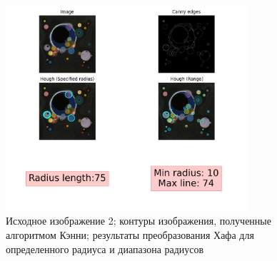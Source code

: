 \begin{figure}[ht!]
    \centering
    \includegraphics[width=0.8\textwidth]{images/circles/Kandinsky_Several_Circles.jpg}
    \caption{Исходное изображение 2; контуры изображения, полученные алгоритмом Кэнни; результаты преобразования Хафа для определенного радиуса и диапазона радиусов}
    \label{img:kan_fin}
\end{figure}

